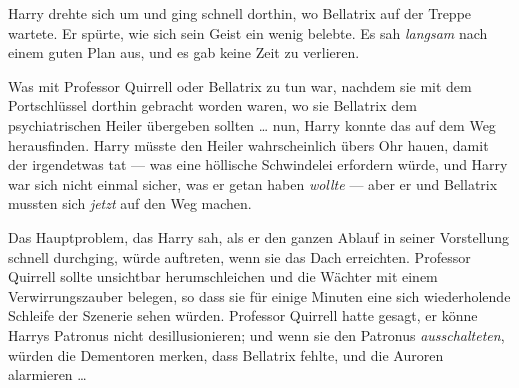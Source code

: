 Harry drehte sich um und ging schnell dorthin, wo Bellatrix auf der Treppe wartete. Er spürte, wie sich sein Geist ein wenig belebte. Es sah \emph{langsam} nach einem guten Plan aus, und es gab keine Zeit zu verlieren.

Was mit Professor Quirrell oder Bellatrix zu tun war, nachdem sie mit dem Portschlüssel dorthin gebracht worden waren, wo sie Bellatrix dem psychiatrischen Heiler übergeben sollten … nun, Harry konnte das auf dem Weg herausfinden. Harry müsste den Heiler wahrscheinlich übers Ohr hauen, damit der irgendetwas tat — was eine höllische Schwindelei erfordern würde, und Harry war sich nicht einmal sicher, was er getan haben \emph{wollte} — aber er und Bellatrix mussten sich \emph{jetzt} auf den Weg machen.

Das Hauptproblem, das Harry sah, als er den ganzen Ablauf in seiner Vorstellung schnell durchging, würde auftreten, wenn sie das Dach erreichten. Professor Quirrell sollte unsichtbar herumschleichen und die Wächter mit einem Verwirrungszauber belegen, so dass sie für einige Minuten eine sich wiederholende Schleife der Szenerie sehen würden. Professor Quirrell hatte gesagt, er könne Harrys Patronus nicht desillusionieren; und wenn sie den Patronus \emph{ausschalteten}, würden die Dementoren merken, dass Bellatrix fehlte, und die Auroren alarmieren … %

